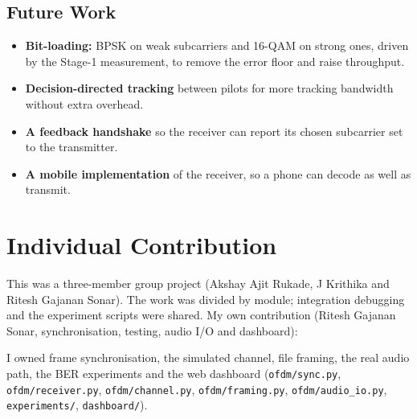 \documentclass[11pt,a4paper]{report}
\begin{document}
\section{Future Work}
\begin{itemize}
    \item \textbf{Bit-loading:} BPSK on weak subcarriers and 16-QAM on strong ones,
    driven by the Stage-1 measurement, to remove the error floor and raise throughput.
    \item \textbf{Decision-directed tracking} between pilots for more tracking bandwidth
    without extra overhead.
    \item \textbf{A feedback handshake} so the receiver can report its chosen subcarrier
    set to the transmitter.
    \item \textbf{A mobile implementation} of the receiver, so a phone can decode as
    well as transmit.
\end{itemize}

\chapter{Individual Contribution}

This was a three-member group project (Akshay Ajit Rukade, J Krithika and Ritesh Gajanan Sonar). The work was divided by module;
integration debugging and the experiment scripts were shared. My own contribution
(Ritesh Gajanan Sonar, synchronisation, testing, audio I/O and dashboard):

{\sloppy
I owned frame synchronisation, the simulated channel, file framing, the real audio
path, the BER experiments and the web dashboard (\texttt{ofdm/sync.py},
\texttt{ofdm/receiver.py}, \texttt{ofdm/channel.py}, \texttt{ofdm/framing.py},
\texttt{ofdm/audio\_io.py}, \texttt{experiments/}, \texttt{dashboard/}).\par}
\end{document}
